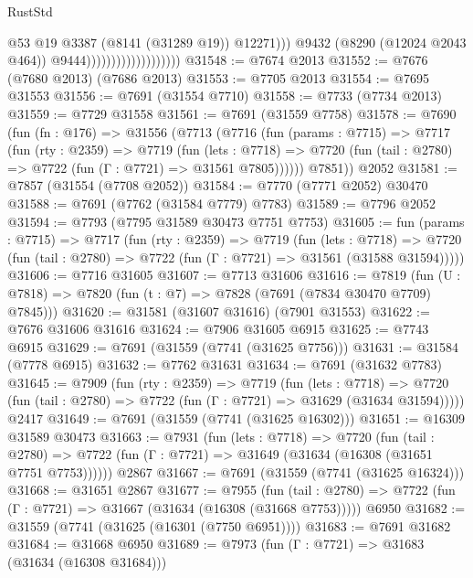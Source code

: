 \begin{lexlean}{RustStd}
\begin{coremodule}
                                                @53
                                                @19
                                                @3387
                                                (@8141 (@31289 @19))
                                                @12271)))
                                          @9432
                                          (@8290 (@12024 @2043 @464))
                                          @9444)))))))))))))))))))
@31548 := @7674 @2013
@31552 := @7676 (@7680 @2013) (@7686 @2013)
@31553 := @7705 @2013
@31554 := @7695 @31553
@31556 := @7691 (@31554 @7710)
@31558 := @7733 (@7734 @2013)
@31559 := @7729 @31558
@31561 := @7691 (@31559 @7758)
@31578 := @7690
    (fun (fn : @176) =>
    @31556
      (@7713
        (@7716
          (fun (params : @7715) =>
          @7717
            (fun (rty : @2359) =>
            @7719
              (fun (lets : @7718) =>
              @7720 (fun (tail : @2780) => @7722 (fun (Γ : @7721) => @31561 @7805))))))
        @7851))
    @2052
@31581 := @7857 (@31554 (@7708 @2052))
@31584 := @7770 (@7771 @2052) @30470
@31588 := @7691 (@7762 (@31584 @7779) @7783)
@31589 := @7796 @2052
@31594 := @7793 (@7795 @31589 @30473 @7751 @7753)
@31605 := fun (params : @7715) =>
  @7717
    (fun (rty : @2359) =>
    @7719
      (fun (lets : @7718) =>
      @7720 (fun (tail : @2780) => @7722 (fun (Γ : @7721) => @31561 (@31588 @31594)))))
@31606 := @7716 @31605
@31607 := @7713 @31606
@31616 := @7819
    (fun (U : @7818) => @7820 (fun (t : @7) => @7828 (@7691 (@7834 @30470 @7709) @7845)))
@31620 := @31581 (@31607 @31616) (@7901 @31553)
@31622 := @7676 @31606 @31616
@31624 := @7906 @31605 @6915
@31625 := @7743 @6915
@31629 := @7691 (@31559 (@7741 (@31625 @7756)))
@31631 := @31584 (@7778 @6915)
@31632 := @7762 @31631
@31634 := @7691 (@31632 @7783)
@31645 := @7909
    (fun (rty : @2359) =>
    @7719
      (fun (lets : @7718) =>
      @7720 (fun (tail : @2780) => @7722 (fun (Γ : @7721) => @31629 (@31634 @31594)))))
    @2417
@31649 := @7691 (@31559 (@7741 (@31625 @16302)))
@31651 := @16309 @31589 @30473
@31663 := @7931
    (fun (lets : @7718) =>
    @7720
      (fun (tail : @2780) =>
      @7722 (fun (Γ : @7721) => @31649 (@31634 (@16308 (@31651 @7751 @7753))))))
    @2867
@31667 := @7691 (@31559 (@7741 (@31625 @16324)))
@31668 := @31651 @2867
@31677 := @7955
    (fun (tail : @2780) => @7722 (fun (Γ : @7721) => @31667 (@31634 (@16308 (@31668 @7753)))))
    @6950
@31682 := @31559 (@7741 (@31625 (@16301 (@7750 @6951))))
@31683 := @7691 @31682
@31684 := @31668 @6950
@31689 := @7973 (fun (Γ : @7721) => @31683 (@31634 (@16308 @31684)))

\end{coremodule}
\end{lexlean}
